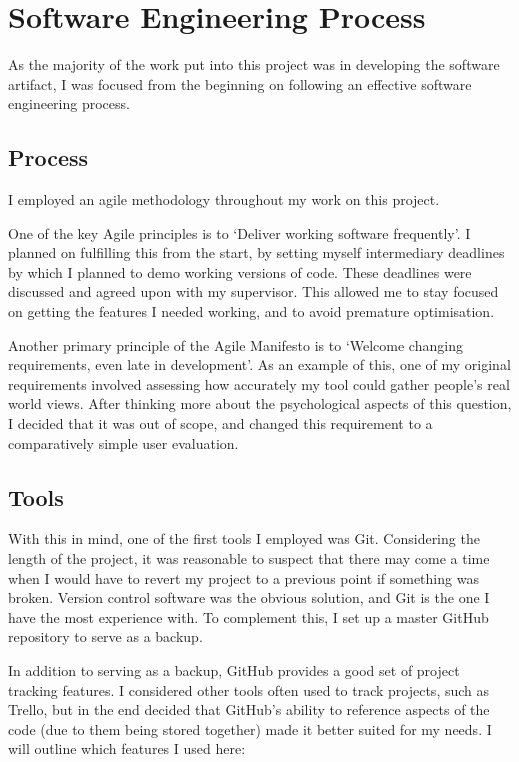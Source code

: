 \chapter{Software Engineering Process}

As the majority of the work put into this project was in developing the software artifact, I was focused from the beginning on following an effective software engineering process.

\section{Process}
I employed an agile\cite{Agile} methodology throughout my work on this project. 

One of the key Agile principles is to `Deliver working software frequently'\cite{AgileKey}. I planned on fulfilling this from the start, by setting myself intermediary deadlines by which I planned to demo working versions of code. These deadlines were discussed and agreed upon with my supervisor. This allowed me to stay focused on getting the features I needed working, and to avoid premature optimisation.

Another primary principle of the Agile Manifesto is to `Welcome changing requirements, even late in development'\cite{AgileKey}. As an example of this, one of my original requirements involved assessing how accurately my tool could gather people's real world views. After thinking more about the psychological aspects of this question, I decided that it was out of scope, and changed this requirement to a comparatively simple user evaluation. 

\section{Tools}
With this in mind, one of the first tools I employed was Git\cite{Git}.
Considering the length of the project, it was reasonable to suspect that there may come a time when I would have to revert my project to a previous point if something was broken.
Version control software was the obvious solution, and Git is the one I have the most experience with. To complement this, I set up a master GitHub\cite{GitHub} repository to serve as a backup.

In addition to serving as a backup, GitHub provides a good set of project tracking features. 
I considered other tools often used to track projects, such as Trello\cite{Trello}, but in the end decided that GitHub's ability to reference aspects of the code (due to them being stored together) made it better suited for my needs. 
I will outline which features I used here:

